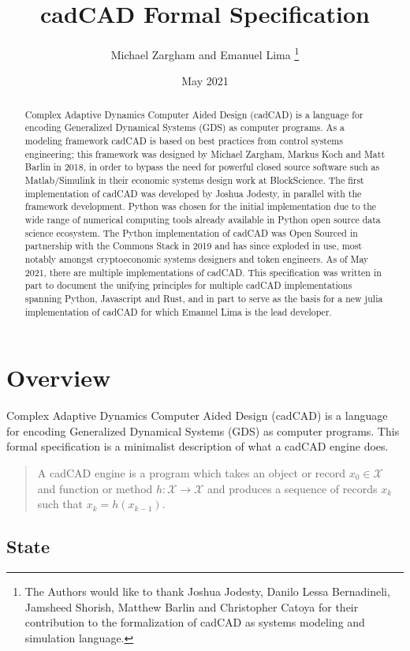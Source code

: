 \documentclass[]{article}
\author{Michael Zargham and Emanuel Lima \thanks{The Authors would like to thank Joshua Jodesty, Danilo Lessa Bernadineli, Jamsheed Shorish, Matthew Barlin and Christopher Catoya for their contribution to the formalization of cadCAD as systems modeling and simulation language.}}
\date{May 2021}
\title{cadCAD Formal Specification}
\begin{document}
\maketitle{}
\begin{abstract}
Complex Adaptive Dynamics Computer Aided Design (cadCAD) is a language
for encoding Generalized Dynamical Systems (GDS) as computer programs. As a modeling framework cadCAD is based on best practices from control systems engineering; this framework was designed by Michael Zargham, Markus Koch and Matt Barlin in 2018, in order to bypass the need for powerful closed source software such as Matlab/Simulink in their economic systems design work at BlockScience. The first implementation of cadCAD was developed by Joshua Jodesty, in parallel with the framework development. Python was chosen for the initial implementation due to the wide range of numerical computing tools already available in Python open source data science ecosystem. The Python implementation of cadCAD was Open Sourced in partnership with the Commons Stack in 2019 and has since exploded in use, most notably amongst cryptoeconomic systems designers and token engineers. As of May 2021, there are multiple implementations of cadCAD. This specification was written in part to document the unifying principles for multiple cadCAD implementations spanning Python, Javascript and Rust, and in part to serve as the basis for a new julia implementation of cadCAD for which Emanuel Lima is the lead developer. 
\end{abstract}
\section{Overview\label{cadcad-spec}}

Complex Adaptive Dynamics Computer Aided Design (cadCAD) is a language
for encoding Generalized Dynamical Systems (GDS) as computer programs.
This formal specification is a minimalist description of what a cadCAD engine does.

\begin{quote}
A cadCAD engine is a program which takes an object or record \(x_0 \in \mathcal{X}\) and function or method \(h:\mathcal{X}\rightarrow \mathcal{X}\) and produces a sequence of
records \(x_k\) such that \(x_k = h(x_{k-1})\).
\end{quote}

\hypertarget{state}{%
\subsection{State}\label{state}}
\end{document}
